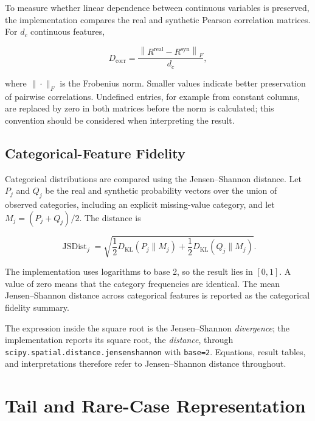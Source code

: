 To measure whether linear dependence between continuous variables is
preserved, the implementation compares the real and synthetic Pearson
correlation matrices. For $d_c$ continuous features,

\begin{equation}
    D_{\mathrm{corr}} =
        \frac{\left\|R^{\mathrm{real}}-R^{\mathrm{syn}}\right\|_F}{d_c},
    \label{eq:evaluation_correlation}
\end{equation}

where $\|\cdot\|_F$ is the Frobenius norm. Smaller values indicate better
preservation of pairwise correlations. Undefined entries, for example from
constant columns, are replaced by zero in both matrices before the norm is
calculated; this convention should be considered when interpreting the result.

\subsection{Categorical-Feature Fidelity}
\label{subsec:categorical_fidelity}

Categorical distributions are compared using the Jensen--Shannon distance.
Let $P_j$ and $Q_j$ be the real and synthetic probability vectors over the
union of observed categories, including an explicit missing-value category,
and let $M_j=(P_j+Q_j)/2$. The distance is

\begin{equation}
    \operatorname{JSDist}_j =
    \sqrt{\frac{1}{2}D_{\mathrm{KL}}(P_j\|M_j)
          +\frac{1}{2}D_{\mathrm{KL}}(Q_j\|M_j)}.
    \label{eq:evaluation_js}
\end{equation}

The implementation uses logarithms to base 2, so the result lies in $[0,1]$.
A value of zero means that the category frequencies are identical. The mean
Jensen--Shannon distance across categorical features is reported as the
categorical fidelity summary.

The expression inside the square root is the Jensen--Shannon
\emph{divergence}; the implementation reports its square root, the
\emph{distance}, through \texttt{scipy.spatial.distance.jensenshannon}
with \texttt{base=2}. Equations, result tables, and interpretations therefore
refer to Jensen--Shannon distance throughout.

\section{Tail and Rare-Case Representation}
\label{sec:tail_rare_evaluation}

